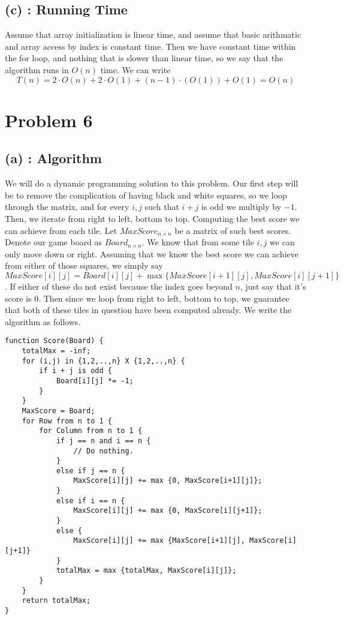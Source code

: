 \documentclass{article}
\begin{document}
\subsection*{(c) : Running Time}
Assume that array initialization is linear time, and assume that basic arithmatic and array access
by index is constant time. Then we have constant time within the for loop, and nothing that is
slower than linear time, so we say that the algorithm runs in $O(n)$ time. We can write
\[
    T(n) = 2 \cdot O(n)  + 2 \cdot O(1) + (n-1) \cdot (O(1)) + O(1) = O(n)
\]
\section*{Problem 6}
\subsection*{(a) : Algorithm}
We will do a dynamic programming solution to this problem. Our first step will be to remove
the complication of having black and white squares, so we loop through the matrix, and for every
$i,j$ such that $i+j$ is odd we multiply by $-1$. Then, we iterate from right to left, bottom
to top.
Computing the best score we can achieve from each tile. Let $MaxScore_{n \times n}$ be 
a matrix of such best scores. Denote our game board as $Board_{n \times n}$.
We know that from some tile $i,j$ we can only move down or right.
Assuming that we know the best score we can achieve from either of those squares, we simply
say $MaxScore[i][j] = Board[i][j] + \max \{MaxScore[i+1][j], MaxScore[i][j+1]\}$. If either of these do not
exist because the index goes beyond $n$, just say that it's score is 0. Then since we loop
from right to left, bottom to top, we guarantee that both of these tiles in question have been
computed already. We write the algorithm as follows.
\begin{verbatim}
function Score(Board) {
    totalMax = -inf;
    for (i,j) in {1,2,..,n} X {1,2,..,n} {
        if i + j is odd {
            Board[i][j] *= -1;
        }
    }
    MaxScore = Board;
    for Row from n to 1 {
        for Column from n to 1 {
            if j == n and i == n {
                // Do nothing.
            }
            else if j == n {
                MaxScore[i][j] += max {0, MaxScore[i+1][j]};
            }
            else if i == n {
                MaxScore[i][j] += max {0, MaxScore[i][j+1]};
            }
            else {
                MaxScore[i][j] += max {MaxScore[i+1][j], MaxScore[i][j+1]}
            }
            totalMax = max {totalMax, MaxScore[i][j]};
        }
    }
    return totalMax;
}
\end{verbatim}
\end{document}

